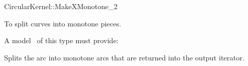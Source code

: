\begin{ccRefFunctionObjectConcept}{CircularKernel::MakeXMonotone_2}

\ccDefinition

To split curves into monotone pieces. 


A model \ccVar\ of this type must provide:

{Splits the arc  into monotone arcs that are returned into the 
output iterator.}

\ccHasModels


\ccSeeAlso


\end{ccRefFunctionObjectConcept}
